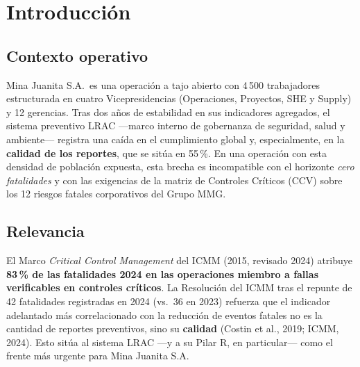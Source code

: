 \documentclass[12pt,a4paper]{article}
\begin{document}
\newpage
\section{Introducción}

\subsection{Contexto operativo}
Mina Juanita S.A.\ es una operación a tajo abierto con 4\,500 trabajadores estructurada en cuatro Vicepresidencias (Operaciones, Proyectos, SHE y Supply) y 12 gerencias. Tras dos años de estabilidad en sus indicadores agregados, el sistema preventivo LRAC ---marco interno de gobernanza de seguridad, salud y ambiente--- registra una caída en el cumplimiento global y, especialmente, en la \textbf{calidad de los reportes}, que se sitúa en 55\,\%. En una operación con esta densidad de población expuesta, esta brecha es incompatible con el horizonte \emph{cero fatalidades} y con las exigencias de la matriz de Controles Críticos (CCV) sobre los 12 riesgos fatales corporativos del Grupo MMG.

\subsection{Relevancia}
El Marco \emph{Critical Control Management} del ICMM (2015, revisado 2024) atribuye \textbf{83\,\% de las fatalidades 2024 en las operaciones miembro a fallas verificables en controles críticos}. La Resolución del ICMM tras el repunte de 42 fatalidades registradas en 2024 (vs.\ 36 en 2023) refuerza que el indicador adelantado más correlacionado con la reducción de eventos fatales no es la cantidad de reportes preventivos, sino su \textbf{calidad} (Costin et al., 2019; ICMM, 2024). Esto sitúa al sistema LRAC ---y a su Pilar R, en particular--- como el frente más urgente para Mina Juanita S.A.
\end{document}
